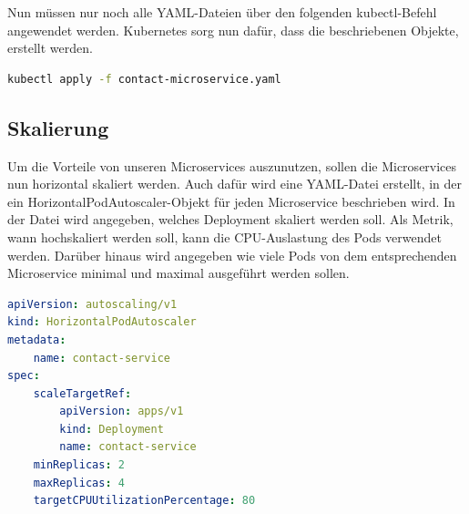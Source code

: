 Nun müssen nur noch alle YAML-Dateien über den folgenden kubectl-Befehl angewendet werden. Kubernetes sorg nun dafür, dass die beschriebenen Objekte, erstellt werden.

\begin{lstlisting}[language=bash, caption=Befehl , captionpos=b]
kubectl apply -f contact-microservice.yaml
\end{lstlisting}

\subsection{Skalierung}

Um die Vorteile von unseren Microservices auszunutzen, sollen die Microservices nun horizontal skaliert werden. Auch dafür wird eine YAML-Datei erstellt, in der ein HorizontalPodAutoscaler-Objekt für jeden Microservice beschrieben wird. In der Datei wird angegeben, welches Deployment skaliert werden soll. Als Metrik, wann hochskaliert werden soll, kann die CPU-Auslastung des Pods verwendet werden. Darüber hinaus wird angegeben wie viele Pods von dem entsprechenden Microservice minimal und maximal ausgeführt werden sollen.

\begin{lstlisting}[language=YAML, caption=Befehl , captionpos=b]
apiVersion: autoscaling/v1
kind: HorizontalPodAutoscaler
metadata:
    name: contact-service
spec:
    scaleTargetRef:
        apiVersion: apps/v1
        kind: Deployment
        name: contact-service
    minReplicas: 2
    maxReplicas: 4
    targetCPUUtilizationPercentage: 80
\end{lstlisting}
